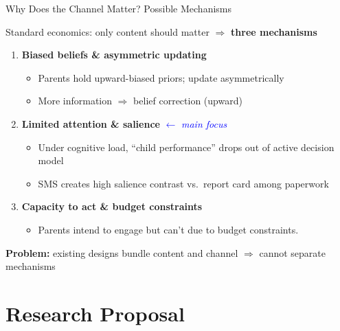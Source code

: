 \documentclass[aspectratio=169,11pt]{beamer}
\begin{document}
\begin{frame}{Why Does the Channel Matter? Possible Mechanisms}

Standard economics: only content should matter $\Rightarrow$ \textbf{three mechanisms}

\bigskip

\begin{enumerate}
    \item \textbf{Biased beliefs \& asymmetric updating}
    \begin{itemize}
        \item Parents hold upward-biased priors; update asymmetrically
        \item More information $\Rightarrow$ belief correction (upward)
    \end{itemize}

    \medskip

    \item \textbf{Limited attention \& salience} \textcolor{blue}{$\leftarrow$ \textit{main focus}}
    \begin{itemize}
        \item Under cognitive load, ``child performance'' drops out of active decision model \citep{gabaix2014sparsity}
        \item SMS creates high salience contrast vs.\ report card among paperwork \citep{bordalo2012salience}
    \end{itemize}

    \medskip

    \item \textbf{Capacity to act \& budget constraints}
    \begin{itemize}
        \item Parents intend to engage but can't due to budget constraints. 
    \end{itemize}
\end{enumerate}

\bigskip
\textbf{Problem:} existing designs bundle content and channel $\Rightarrow$ cannot separate mechanisms
\end{frame}

\section{Research Proposal}
\end{document}
